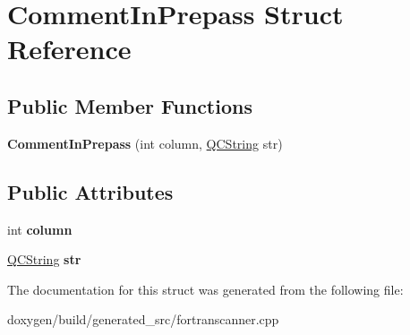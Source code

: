 \hypertarget{struct_comment_in_prepass}{}\section{Comment\+In\+Prepass Struct Reference}
\label{struct_comment_in_prepass}
\subsection*{Public Member Functions}
\begin{DoxyCompactItemize}
\item 
\mbox{\label{struct_comment_in_prepass_a7b607d03ad5f85454397dc1aac904bb0}} 
{\bfseries Comment\+In\+Prepass} (int column, \mbox{\hyperlink{class_q_c_string}{Q\+C\+String}} str)
\end{DoxyCompactItemize}
\subsection*{Public Attributes}
\begin{DoxyCompactItemize}
\item 
\mbox{\label{struct_comment_in_prepass_a84b0d18b00f30aa819ec490f79e24018}} 
int {\bfseries column}
\item 
\mbox{\label{struct_comment_in_prepass_a121d4cd80b9102d3c562acbef48952ca}} 
\mbox{\hyperlink{class_q_c_string}{Q\+C\+String}} {\bfseries str}
\end{DoxyCompactItemize}


The documentation for this struct was generated from the following file\+:\begin{DoxyCompactItemize}
\item 
doxygen/build/generated\+\_\+src/fortranscanner.\+cpp\end{DoxyCompactItemize}
